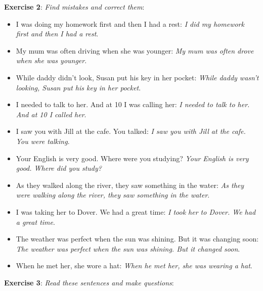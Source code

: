 \textbf{Exercise 2}: \textit{Find mistakes and correct them}:

\begin{itemize}

\item I was doing my homework first and then I had a rest: \textit{I did my homework first and then I had a rest}.
\item My mum was often driving when she was younger: \textit{My mum was often drove when she was younger}.
\item While daddy didn't look, Susan put his key in her pocket: \textit{While daddy wasn't looking, Susan put his key in her pocket}.
\item I needed to talk to her. And at 10 I was calling her: \textit{I needed to talk to her. And at 10 I called her}.
\item I saw you with Jill at the cafe. You talked: \textit{I saw you with Jill at the cafe. You were talking}.
\item Your English is very good. Where were you studying? \textit{Your English is very good. Where did you study?}
\item As they walked along the river, they saw something in the water: \textit{As they were walking along the river, they saw something in the water}.
\item I was taking her to Dover. We had a great time: \textit{I took her to Dover. We had a great time}.
\item The weather was perfect when the sun was shining. But it was changing soon: \textit{The weather was perfect when the sun was shining. But it changed soon}.
\item When he met her, she wore a hat: \textit{When he met her, she was wearing a hat}.

\end{itemize}

\textbf{Exercise 3}: \textit{Read these sentences and make questions}:

